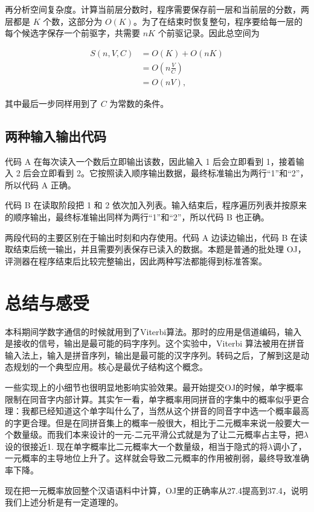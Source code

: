 \documentclass[11pt,a4paper]{ctexart}
\begin{document}
再分析空间复杂度。计算当前层分数时，程序需要保存前一层和当前层的分数，两层都是 $K$ 个数，这部分为 $O(K)$。为了在结束时恢复整句，程序要给每一层的每个候选字保存一个前驱字，共需要 $nK$ 个前驱记录。因此总空间为

\begin{equation}
\begin{aligned}
S(n,V,C)
&=O(K)+O(nK)\\
&=O\!\left(n\frac{V}{C}\right)\\
&=O(nV),
\end{aligned}
\end{equation}

其中最后一步同样用到了 $C$ 为常数的条件。

\subsection{两种输入输出代码}

代码 A 在每次读入一个数后立即输出该数，因此输入 1 后会立即看到 1，接着输入 2 后会立即看到 2。它按照读入顺序输出数据，最终标准输出为两行“1”和“2”，所以代码 A 正确。

代码 B 在读取阶段把 1 和 2 依次加入列表。输入结束后，程序遍历列表并按原来的顺序输出，最终标准输出同样为两行“1”和“2”，所以代码 B 也正确。

两段代码的主要区别在于输出时刻和内存使用。代码 A 边读边输出，代码 B 在读取结束后统一输出，并且需要列表保存已读入的数据。本题是普通的批处理 OJ，评测器在程序结束后比较完整输出，因此两种写法都能得到标准答案。

\section{总结与感受}

本科期间学数字通信的时候就用到了Viterbi算法。那时的应用是信道编码，输入是接收的信号，输出是最可能的码字序列。这个实验中，Viterbi 算法被用在拼音输入法上，输入是拼音序列，输出是最可能的汉字序列。转码之后，了解到这是动态规划的一个典型应用。核心是最优子结构这个概念。

一些实现上的小细节也很明显地影响实验效果。最开始提交OJ的时候，单字概率限制在同音字内部计算。其实乍一看，单字概率用同拼音的字集中的概率似乎更合理：我都已经知道这个单字叫什么了，当然从这个拼音的同音字中选一个概率最高的字更合理。但是在同拼音集上的概率一般很大，相比于二元概率来说一般要大一个数量级。而我们本来设计的一元-二元平滑公式就是为了让二元概率占主导，把$\lambda$设的很接近1. 现在单字概率比二元概率大一个数量级，相当于隐式的将$\lambda$调小了，一元概率的主导地位上升了。这样就会导致二元概率的作用被削弱，最终导致准确率下降。

现在把一元概率放回整个汉语语料中计算，OJ里的正确率从27.4提高到37.4，说明我们上述分析是有一定道理的。
\end{document}
